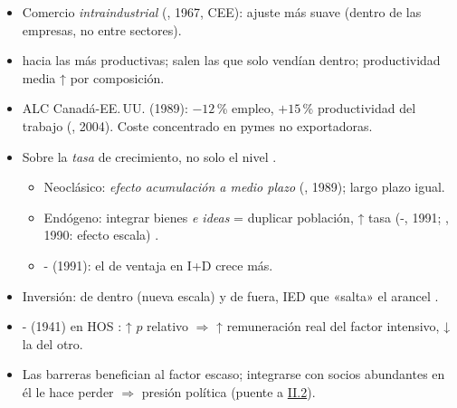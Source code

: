 \documentclass{article}
\begin{document}
\begin{columnas}
\begin{itemize}
\item Comercio \emph{intraindustrial} (, 1967, CEE): ajuste más suave (dentro de las empresas, no entre sectores).
\end{itemize}
\begin{itemize}
\item {} hacia las más productivas; salen las que solo vendían dentro; productividad media ↑ por composición.
\item ALC Canadá-EE.\,UU. (1989): $-12$\,\% empleo, $+15$\,\% productividad del trabajo (, 2004). Coste concentrado en pymes no exportadoras.
\end{itemize}
\begin{itemize}
\item Sobre la \emph{tasa} de crecimiento, no solo el nivel .
  \begin{itemize}
  \item Neoclásico: \emph{efecto acumulación a medio plazo} (, 1989); largo plazo igual.
  \item Endógeno: integrar bienes \emph{e ideas} = duplicar población, ↑ tasa (-, 1991; , 1990: efecto escala) .
  \item {}- (1991): el de ventaja en I+D crece más.
  \end{itemize}
\item Inversión: de dentro (nueva escala) y de fuera, IED que «salta» el arancel .
\end{itemize}
\begin{itemize}
\item {}- (1941) en HOS : ↑ $p$ relativo $\Rightarrow$ ↑ remuneración real del factor intensivo, ↓ la del otro.
\item Las barreras benefician al factor escaso; integrarse con socios abundantes en él le hace perder $\Rightarrow$ presión política (puente a \hyperref[rep:II.2]{II.2}).
\end{itemize}


\end{columnas}
\end{document}
